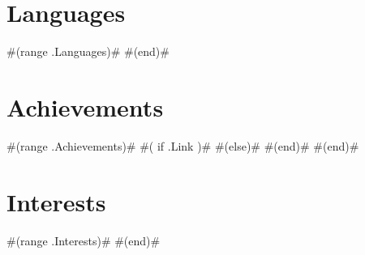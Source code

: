\documentclass[11pt,a4paper]{moderncv}
\begin{document}
\section{Languages}
#(range .Languages)#
#(end)#

\section{Achievements}
#(range .Achievements)#
#( if .Link )#
#(else)#
#(end)#
#(end)#

\section{Interests}
#(range .Interests)#
#(end)#
\end{document}
